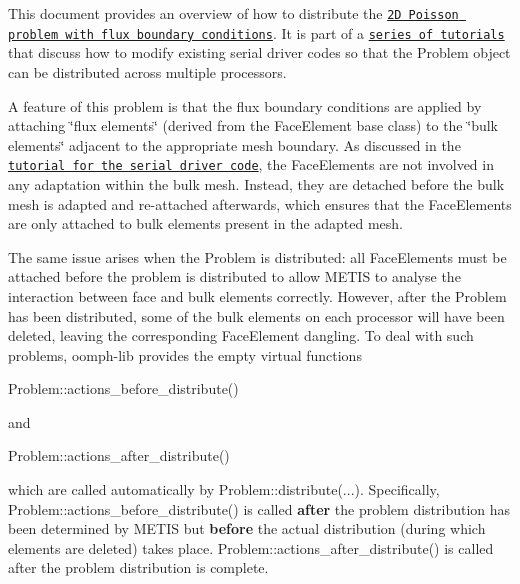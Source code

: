 This document provides an overview of how to distribute the \href{../../../poisson/two_d_poisson_flux_bc_adapt/html/index.html}{\tt 2D Poisson problem with flux boundary conditions}. It is part of a \href{../../../example_code_list/html/index.html#distributed}{\tt series of tutorials} that discuss how to modify existing serial driver codes so that the {\ttfamily Problem} object can be distributed across multiple processors.

A feature of this problem is that the flux boundary conditions are applied by attaching \char`\"{}flux elements\char`\"{} (derived from the {\ttfamily Face\+Element} base class) to the \char`\"{}bulk elements\char`\"{} adjacent to the appropriate mesh boundary. As discussed in the \href{../../../poisson/two_d_poisson_flux_bc_adapt/html/index.html}{\tt tutorial for the serial driver code}, the {\ttfamily Face\+Elements} are not involved in any adaptation within the bulk mesh. Instead, they are detached before the bulk mesh is adapted and re-\/attached afterwards, which ensures that the {\ttfamily Face\+Elements} are only attached to bulk elements present in the adapted mesh.

The same issue arises when the {\ttfamily Problem} is distributed\+: all {\ttfamily Face\+Elements} must be attached before the problem is distributed to allow {\ttfamily M\+E\+T\+IS} to analyse the interaction between face and bulk elements correctly. However, after the {\ttfamily Problem} has been distributed, some of the bulk elements on each processor will have been deleted, leaving the corresponding {\ttfamily Face\+Element} dangling. To deal with such problems, {\ttfamily oomph-\/lib} provides the empty virtual functions


\begin{DoxyCode}
Problem::actions\_before\_distribute() 
\end{DoxyCode}


and


\begin{DoxyCode}
Problem::actions\_after\_distribute() 
\end{DoxyCode}


which are called automatically by {\ttfamily Problem\+::distribute}(...). Specifically, {\ttfamily Problem\+::actions\+\_\+before\+\_\+distribute()} is called {\bfseries after} the problem distribution has been determined by {\ttfamily M\+E\+T\+IS} but {\bfseries before} the actual distribution (during which elements are deleted) takes place. {\ttfamily Problem\+::actions\+\_\+after\+\_\+distribute()} is called after the problem distribution is complete.

